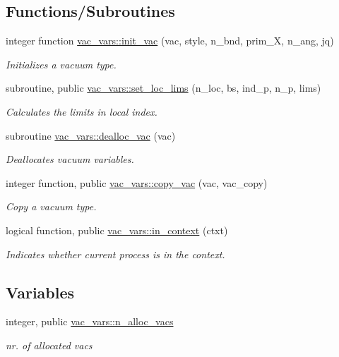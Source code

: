 \subsection*{Functions/\+Subroutines}
\begin{DoxyCompactItemize}
\item 
integer function \hyperlink{namespacevac__vars_a81df0b01b0c2bf8072453f4ca12e2d5e}{vac\+\_\+vars\+::init\+\_\+vac} (vac, style, n\+\_\+bnd, prim\+\_\+X, n\+\_\+ang, jq)
\begin{DoxyCompactList}\small\item\em Initializes a vacuum type. \end{DoxyCompactList}\item 
subroutine, public \hyperlink{namespacevac__vars_a5bfa31e3a61464281d70a4e1a8246510}{vac\+\_\+vars\+::set\+\_\+loc\+\_\+lims} (n\+\_\+loc, bs, ind\+\_\+p, n\+\_\+p, lims)
\begin{DoxyCompactList}\small\item\em Calculates the limits in local index. \end{DoxyCompactList}\item 
subroutine \hyperlink{namespacevac__vars_aa6669ed787cf96e8f8fa665149bc83a3}{vac\+\_\+vars\+::dealloc\+\_\+vac} (vac)
\begin{DoxyCompactList}\small\item\em Deallocates vacuum variables. \end{DoxyCompactList}\item 
integer function, public \hyperlink{namespacevac__vars_a8da702035bfcc208bd810258f9944f6a}{vac\+\_\+vars\+::copy\+\_\+vac} (vac, vac\+\_\+copy)
\begin{DoxyCompactList}\small\item\em Copy a vacuum type. \end{DoxyCompactList}\item 
logical function, public \hyperlink{namespacevac__vars_af0fd2f819434bf7adc494753df4af19c}{vac\+\_\+vars\+::in\+\_\+context} (ctxt)
\begin{DoxyCompactList}\small\item\em Indicates whether current process is in the context. \end{DoxyCompactList}\end{DoxyCompactItemize}
\subsection*{Variables}
\begin{DoxyCompactItemize}
\item 
integer, public \hyperlink{namespacevac__vars_a48e085d21d3006e777a7052577e89a21}{vac\+\_\+vars\+::n\+\_\+alloc\+\_\+vacs}
\begin{DoxyCompactList}\small\item\em nr. of allocated vacs \end{DoxyCompactList}\end{DoxyCompactItemize}
